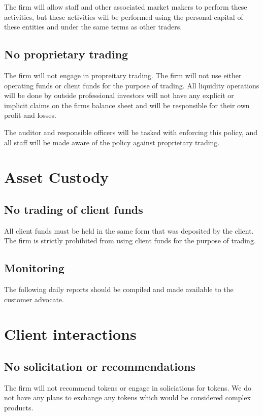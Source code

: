 The firm will allow staff and other associated market makers to
perform these activities, but these activities will be performed using
the personal capital of these entities and under the same terms as
other traders.

\subsection{No proprietary trading}

The firm will not engage in propreitary trading.  The firm will not
use either operating funds or client funds for the purpose of
trading.  All liquidity operations will be done by outside
professional investors will not have any explicit or implicit claims
on the firms balance sheet and will be responsible for their own
profit and losses.

The auditor and responsible officers will be tasked with enforcing
this policy, and all staff will be made aware of the policy against
proprietary trading.

\section{Asset Custody}
\subsection{No trading of client funds}
All client funds must be held in the same form that was deposited by
the client.  The firm is strictly prohibited from using client funds
for the purpose of trading.

\subsection{Monitoring}

The following daily reports should be compiled and made available to
the customer advocate.

\section{Client interactions}
\subsection{No solicitation or recommendations}
The firm will not recommend tokens or engage in soliciations for
tokens.  We do not have any plans to exchange any tokens which would
be considered complex products.

